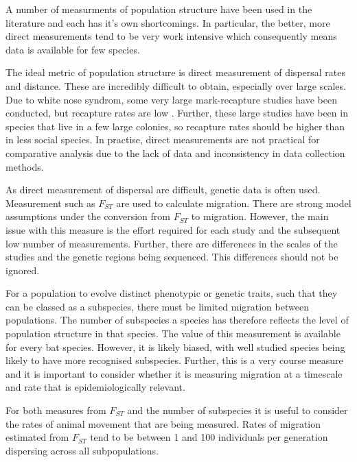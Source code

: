
A number of measurments of population structure have been used in the literature and each has it's own shortcomings.
In particular, the better, more direct measurements tend to be very work intensive which consequently means data is available for few species.


The ideal metric of population structure is direct measurement of dispersal rates and distance.
These are incredibly difficult to obtain, especially over large scales.
Due to white nose syndrom, some very large mark-recapture studies have been conducted, but recapture rates are low \cite{}.
Further, these large studies have been in species that live in a few large colonies, so recapture rates should be higher than in less social species.
In practise, direct measurements are not practical for comparative analysis due to the lack of data and inconsistency in data collection methods.



As direct measurement of dispersal are difficult, genetic data is often used.
Measurement such as $F_{ST}$ are used to calculate migration.
There are strong model assumptions under the conversion from $F_{ST}$ to migration.
However, the main issue with this measure is the effort required for each study and the subsequent low number of measurements.
Further, there are differences in the scales of the studies and the genetic regions being sequenced.
This differences should not be ignored.


For a population to evolve distinct phenotypic or genetic traits, such that they can be classed as a subspecies, there must be limited migration between populations.
The number of subspecies a species has therefore reflects the level of population structure in that species.
The value of this measurement is available for every bat species.
However, it is likely biased, with well studied species being likely to have more recognised subspecies.
Further, this is a very course measure and it is important to consider whether it is measuring migration at a timescale and rate that is epidemiologically relevant.

For both measures from $F_{ST}$ and the number of subspecies it is useful to consider the rates of animal movement that are being measured.
Rates of migration estimated from $F_{ST}$ tend to be between 1 and 100 individuals per generation dispersing across all subpopulations.


